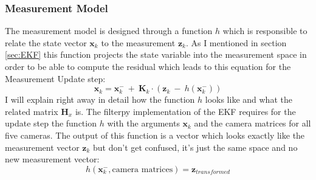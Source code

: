 \subsubsection{Measurement Model}
The measurement model is designed through a function $h$ which is responsible to relate the state vector $\mathbf{x}_k$ to the measurement $\mathbf{z}_k$. As I mentioned in section \ref{sec:EKF} this function projects the state variable into the measurement space in order to be able to compute the residual which leads to this equation for the Measurement Update step:
\begin{equation}
\mathbf{x}_k = \mathbf{x}_k^- \ + \ \mathbf{K}_k\cdot (\mathbf{z}_k \ - \ h(\mathbf{x}_k^-))
\end{equation}
I will explain right  away in detail how the function $h$ looks like and what the related matrix $\mathbf{H}_x$ is. The filterpy implementation \cite{filterpydoc} of the EKF requires for the update step the function $h$ with the arguments $\mathbf{x}_k$ and the camera matrices for all five cameras. The output of this function is a vector which looks exactly like the measurement vector $\mathbf{z}_k$ but don't get confused, it's just the same space and no new measurement vector:
\begin{equation}
h(\mathbf{x}^-_k, \text{camera matrices}) = \mathbf{z}_{transformed}
\end{equation}

